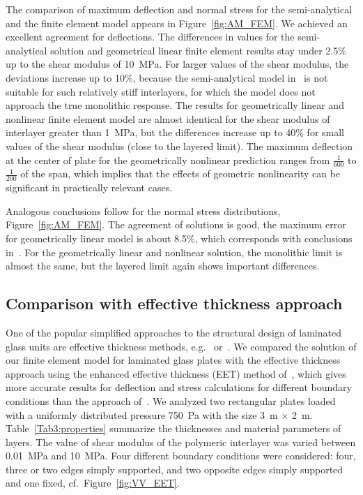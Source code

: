 \documentclass[11pt]{article}
\newcommand{\Tref}[1]{Table~\ref{#1}}
\begin{document}
The comparison of maximum deflection and normal stress for the semi-analytical and the finite element model appears in Figure~\ref{fig:AM_FEM}. We achieved an excellent agreement for deflections. The differences in values for the semi-analytical solution and geometrical linear finite element results stay under 2.5\% up to the shear modulus of 10~MPa. For larger values of the shear modulus, the deviations increase up to 10\%, because the semi-analytical model in~\cite{Foraboschi:2012:AMLGP} is not suitable for such relatively stiff interlayers,
for which the model does not approach the true monolithic response. The results for geometrically linear and nonlinear finite element model are almost identical for the shear modulus of interlayer greater than 1~MPa, but the differences increase up to 40\% for small values of the shear modulus (close to the layered limit). The maximum deflection at the center of plate for the geometrically nonlinear prediction ranges from $\frac{1}{600}$ to $\frac{1}{200}$ of the span, which implies that the effects of geometric nonlinearity can be significant in practically relevant cases.

Analogous conclusions follow for the normal stress distributions, Figure~\ref{fig:AM_FEM}. The agreement of solutions is good, the maximum error for geometrically linear model is about 8.5\%, which corresponds with conclusions in~\cite{Foraboschi:2012:AMLGP}. For the geometrically linear and nonlinear solution, the monolithic limit is almost the same, but the layered limit again shows important differences.

\subsection{Comparison with effective thickness approach}\label{sec:verET} 
One of the popular simplified approaches to the structural design of laminated glass units are effective thickness methods, e.g.~\cite{Benninson:2008:HPLG} or~\cite{Galuppi:2012:PEFD}. We compared the solution of our finite element model for laminated glass plates with the effective thickness approach using the enhanced effective thickness (EET) method of~\cite{Galuppi:2012:PEFD}, which gives more accurate results for deflection and stress calculations for different boundary conditions than the approach of~\cite{Benninson:2008:HPLG}. We  analyzed two rectangular plates loaded with a uniformly distributed pressure 750~Pa with the size 3~m $\times$ 2~m. \Tref{Tab3:properties} summarize the thicknesses and material parameters of layers. The value of shear modulus of the polymeric interlayer was varied between 0.01~MPa and 10~MPa. Four different boundary conditions were considered: four, three or two edges simply supported, and two opposite edges simply supported and one fixed, cf.~Figure~\ref{fig:VV_EET}.
\end{document}
